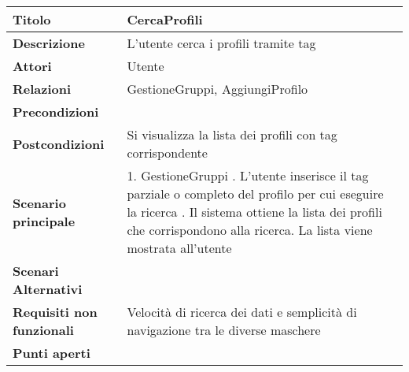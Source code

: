 \begin{tabular} {|P{4.5cm}|P{12.5cm}|}
  \hline
  \textbf{Titolo}                   & CercaProfili                                                                     \\
  \hline
  \textbf{Descrizione}              & L'utente cerca i profili tramite tag                                             \\
  \hline
  \textbf{Attori}                   & Utente                                                                           \\
  \hline
  \textbf{Relazioni}                & GestioneGruppi, AggiungiProfilo                                                  \\
  \hline
  \textbf{Precondizioni}            &                                                                                  \\
  \hline
  \textbf{Postcondizioni}           & Si visualizza la lista dei profili con tag corrispondente                        \\
  \hline
  \textbf{Scenario principale}      & 1. GestioneGruppi . L'utente inserisce il tag parziale o completo del profilo per cui eseguire la ricerca . Il sistema ottiene la lista dei profili che corrispondono alla ricerca. La lista viene mostrata all'utente                                                                                \\
  \hline
  \textbf{Scenari Alternativi}      &                                                                                  \\
  \hline
  \textbf{Requisiti non funzionali} & Velocità di ricerca dei dati e semplicità di navigazione tra le diverse maschere \\
  \hline
  \textbf{Punti aperti}             &                                                                                  \\
  \hline
\end{tabular}
\hfill
\break

